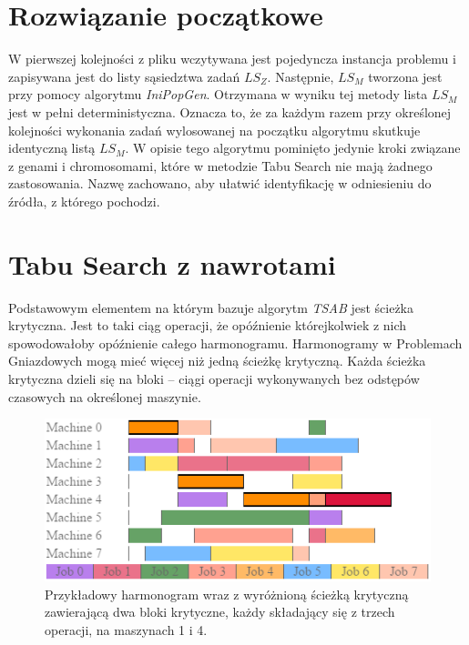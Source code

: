 \documentclass[printmode,oneside]{mgr}
\begin{document}
\section{Rozwiązanie początkowe}
W pierwszej kolejności z pliku wczytywana jest pojedyncza instancja problemu i zapisywana jest do listy sąsiedztwa zadań $LS_Z$. Następnie, $LS_M$ tworzona jest przy pomocy algorytmu \emph{IniPopGen}. Otrzymana w wyniku tej metody lista $LS_M$ jest w pełni deterministyczna. Oznacza to, że za każdym razem przy określonej kolejności wykonania zadań wylosowanej na początku algorytmu skutkuje identyczną listą $LS_M$. W opisie tego algorytmu pominięto jedynie kroki związane z genami i chromosomami, które w metodzie Tabu Search nie mają żadnego zastosowania. Nazwę zachowano, aby ułatwić identyfikację w odniesieniu do źródła, z którego pochodzi.
%
\section{Tabu Search z nawrotami}
Podstawowym elementem na którym bazuje algorytm \emph{TSAB} jest ścieżka krytyczna. Jest to taki ciąg operacji, że opóźnienie którejkolwiek z nich spowodowałoby opóźnienie całego harmonogramu. Harmonogramy w Problemach Gniazdowych mogą mieć więcej niż jedną ścieżkę krytyczną. Każda ścieżka krytyczna dzieli się na bloki \cite{Grabowski86} -- ciągi operacji wykonywanych bez odstępów czasowych na określonej maszynie.
\begin{figure}[!ht]
\begin{center}
\includegraphics[scale=1.0]{rysunki/criticalPath2.png}
\caption[Przykładowy harmonogram wraz z wyróżnioną ścieżką krytyczną]{Przykładowy harmonogram wraz z wyróżnioną ścieżką krytyczną zawierającą dwa bloki krytyczne, każdy składający się z trzech operacji, na maszynach 1 i 4.}
\label{rys_critical_path_example}
\end{center}
\end{figure}
%
\end{document}
